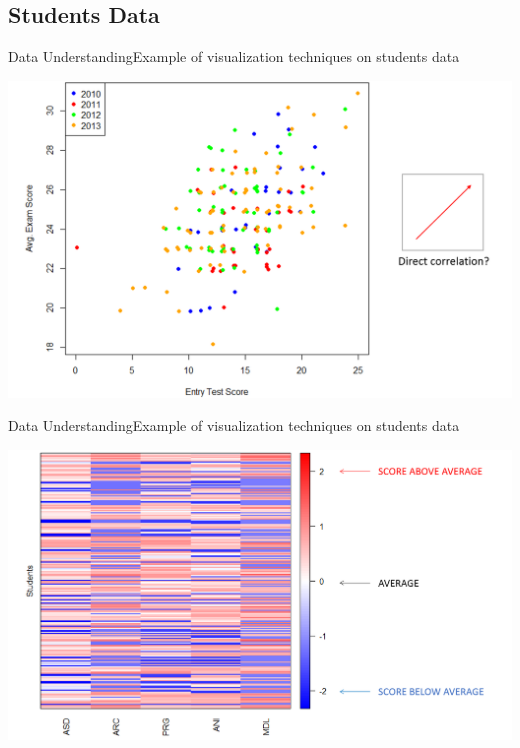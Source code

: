 \subsection{Students Data}
\begin{frame}{Data Understanding}{Example of visualization techniques on students data}

    \vspace{0.2cm}
    \begin{centering}
        \includegraphics[scale=0.28]{img2_noback.png}
    \end{centering}

\end{frame}

\begin{frame}{Data Understanding}{Example of visualization techniques on students data}

    \vspace{0.5cm}
    \noindent\begin{centering}
        \includegraphics[scale=0.25]{img3.png}
    \end{centering}

\end{frame}

